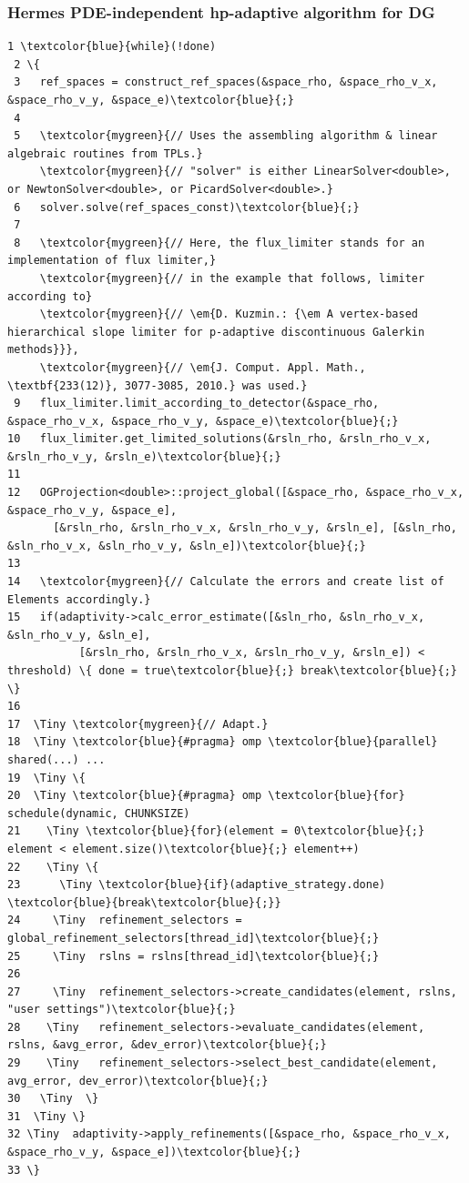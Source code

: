 \documentclass{beamer}
\begin{document}
\begin{frame}[fragile]
\frametitle{Hermes PDE-independent hp-adaptive algorithm for DG}
\begin{Verbatim}[commandchars=\\\{\}, fontsize=\Tinyc]
 1 \textcolor{blue}{while}(!done)
 2 \{
 3   ref_spaces = construct_ref_spaces(&space_rho, &space_rho_v_x, &space_rho_v_y, &space_e)\textcolor{blue}{;}
 4
 5   \textcolor{mygreen}{// Uses the assembling algorithm & linear algebraic routines from TPLs.}
     \textcolor{mygreen}{// "solver" is either LinearSolver<double>, or NewtonSolver<double>, or PicardSolver<double>.}
 6   solver.solve(ref_spaces_const)\textcolor{blue}{;}
 7   
 8   \textcolor{mygreen}{// Here, the flux_limiter stands for an implementation of flux limiter,}
     \textcolor{mygreen}{// in the example that follows, limiter according to}
     \textcolor{mygreen}{// \em{D. Kuzmin.: {\em A vertex-based hierarchical slope limiter for p-adaptive discontinuous Galerkin methods}}}, 
     \textcolor{mygreen}{// \em{J. Comput. Appl. Math., \textbf{233(12)}, 3077-3085, 2010.} was used.}
 9   flux_limiter.limit_according_to_detector(&space_rho, &space_rho_v_x, &space_rho_v_y, &space_e)\textcolor{blue}{;}
10   flux_limiter.get_limited_solutions(&rsln_rho, &rsln_rho_v_x, &rsln_rho_v_y, &rsln_e)\textcolor{blue}{;}
11
12   OGProjection<double>::project_global([&space_rho, &space_rho_v_x, &space_rho_v_y, &space_e],
       [&rsln_rho, &rsln_rho_v_x, &rsln_rho_v_y, &rsln_e], [&sln_rho, &sln_rho_v_x, &sln_rho_v_y, &sln_e])\textcolor{blue}{;}
13
14   \textcolor{mygreen}{// Calculate the errors and create list of Elements accordingly.}
15   if(adaptivity->calc_error_estimate([&sln_rho, &sln_rho_v_x, &sln_rho_v_y, &sln_e],
           [&rsln_rho, &rsln_rho_v_x, &rsln_rho_v_y, &rsln_e]) < threshold) \{ done = true\textcolor{blue}{;} break\textcolor{blue}{;} \}
16 
17  \Tiny \textcolor{mygreen}{// Adapt.}
18  \Tiny \textcolor{blue}{#pragma} omp \textcolor{blue}{parallel} shared(...) ...
19  \Tiny \{
20  \Tiny \textcolor{blue}{#pragma} omp \textcolor{blue}{for} schedule(dynamic, CHUNKSIZE)
21    \Tiny \textcolor{blue}{for}(element = 0\textcolor{blue}{;} element < element.size()\textcolor{blue}{;} element++)
22    \Tiny \{
23      \Tiny \textcolor{blue}{if}(adaptive_strategy.done) \textcolor{blue}{break\textcolor{blue}{;}}
24     \Tiny  refinement_selectors = global_refinement_selectors[thread_id]\textcolor{blue}{;}
25     \Tiny  rslns = rslns[thread_id]\textcolor{blue}{;}
26       
27     \Tiny  refinement_selectors->create_candidates(element, rslns, "user settings")\textcolor{blue}{;}
28    \Tiny   refinement_selectors->evaluate_candidates(element, rslns, &avg_error, &dev_error)\textcolor{blue}{;}
29    \Tiny   refinement_selectors->select_best_candidate(element, avg_error, dev_error)\textcolor{blue}{;}
30   \Tiny  \}
31  \Tiny \}
32 \Tiny  adaptivity->apply_refinements([&space_rho, &space_rho_v_x, &space_rho_v_y, &space_e])\textcolor{blue}{;}
33 \}
\end{Verbatim}
\end{frame}
\end{document}
